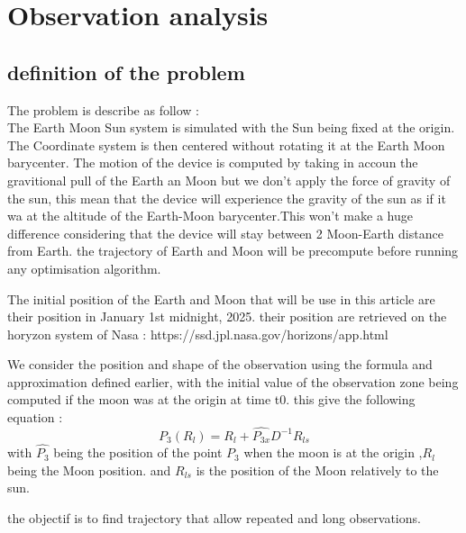 \documentclass[11pt]{article} %
\begin{document}
		\newpage
		\section{Observation analysis}
		
		\subsection{definition of the problem}
		
		The problem is describe as follow :
		\\
		The Earth Moon Sun system is simulated with the Sun being fixed at the origin. The Coordinate system is then centered without rotating it at the Earth Moon barycenter. The motion of the device is computed by taking in accoun the gravitional pull of the Earth an Moon but we don't apply the force of gravity of the sun, this mean that the device will experience the gravity of the sun as if it wa at the altitude of the Earth-Moon barycenter.This won't make a huge difference considering that the device will stay between 2 Moon-Earth distance from Earth. the trajectory of Earth and Moon will be precompute before running any optimisation algorithm.
		
		The initial position of the Earth and Moon that will be use in this article are their position in January 1st midnight, 2025. their position are retrieved on the horyzon system of Nasa : https://ssd.jpl.nasa.gov/horizons/app.html
		
		
		
		We consider the position and shape of the observation using the formula and approximation defined earlier, with the initial value of the observation zone being computed if the moon was at the origin at time t0.
		this give the following equation :
		$$
		P_3(R_l)=R_{l}+\hat{P_{3x}}D^{-1}R_{ls}
		$$
		with $\hat{P_3}$ being the position of the point $P_3$ when the moon is at the origin
		,$R_{l}$ being the Moon position.
		and $R_{ls}$ is the position of the Moon relatively to the sun.
		
		the objectif is to find trajectory that allow repeated and long observations.
		
\end{document}

